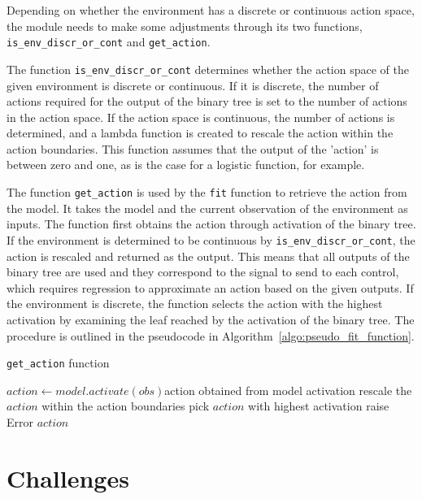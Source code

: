 Depending on whether the environment has a discrete or continuous action space, the module needs to make some adjustments through its two functions, \texttt{is\_env\_discr\_or\_cont} and \texttt{get\_action}.

The function \texttt{is\_env\_discr\_or\_cont} determines whether the action space of the given environment is discrete or continuous. If it is discrete, the number of actions required for the output of the binary tree is set to the number of actions in the action space. If the action space is continuous, the number of actions is determined, and a lambda function is created to rescale the action within the action boundaries. This function assumes that the output of the 'action' is between zero and one, as is the case for a logistic function, for example.

The function \texttt{get\_action} is used by the \texttt{fit} function to retrieve the action from the model. It takes the model and the current observation of the environment as inputs. The function first obtains the action through activation of the binary tree. If the environment is determined to be continuous by \texttt{is\_env\_discr\_or\_cont}, the action is rescaled and returned as the output. This means that all outputs of the binary tree are used and they correspond to the signal to send to each control, which requires regression to approximate an action based on the given outputs. If the environment is discrete, the function selects the action with the highest activation by examining the leaf reached by the activation of the binary tree. The procedure is outlined in the pseudocode in Algorithm~\ref{algo:pseudo_fit_function}.

\begin{algorithm}
\caption{\texttt{get\_action} function}
\label{algo:pseudo_get_action_function}
\begin{algorithmic}
\State $action \gets model.activate(obs)$\Comment action obtained from model activation
    \State rescale the $action$ within the action boundaries
    \State pick $action$ with highest activation
\Else
    \State raise Error
\EndIf
\Return $action$
\EndFunction
\end{algorithmic}
\end{algorithm}

\section{Challenges}

